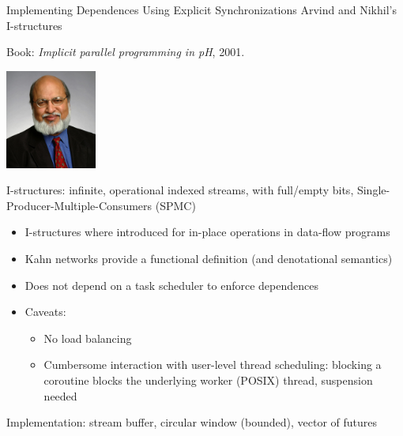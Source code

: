 \documentclass[xcolor=dvipsnames,9pt,mathserif]{beamer}
\renewcommand{\emph}[1]{\alert{#1}}
\begin{document}
\begin{frame}{Implementing Dependences Using Explicit Synchronizations}
  Arvind and Nikhil's I-structures

  Book: \textit{Implicit parallel programming in pH}, 2001.

  \hfill\includegraphics[width=3cm]{arvind}

  \bigskip
  I-structures: infinite, operational indexed streams, with
  \emph{full/empty} bits, Single-Producer-Multiple-Consumers (SPMC)

  \begin{itemize}
  \item I-structures where introduced for in-place operations in
    data-flow programs
  \item Kahn networks provide a functional definition (and
    denotational semantics)
  \item Does \emph{not} depend on a task scheduler to enforce dependences
  \item Caveats:
    \begin{itemize}
    \item No load balancing
    \item Cumbersome interaction with user-level thread scheduling:
      blocking a coroutine blocks the underlying worker (POSIX)
      thread, suspension needed
    \end{itemize}
  \end{itemize}

  Implementation: stream buffer, circular window (bounded), vector of futures
\end{frame}
\end{document}
